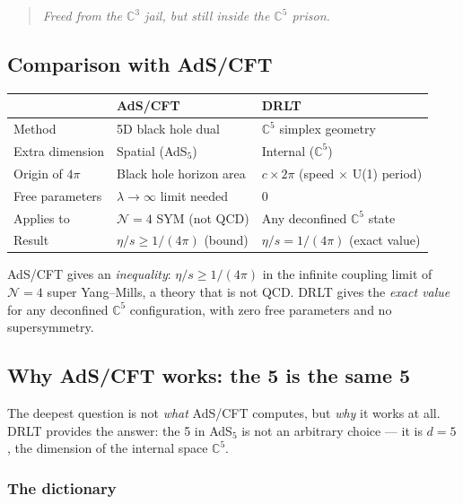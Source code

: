 \begin{quote}
\emph{Freed from the $\mathbb{C}^3$ jail, but still inside the $\mathbb{C}^5$ prison.}
\end{quote}

\subsection{Comparison with AdS/CFT}

\begin{center}
\begin{tabular}{lll}
\hline
& AdS/CFT & DRLT \\
\hline
Method & 5D black hole dual & $\mathbb{C}^5$ simplex geometry \\
Extra dimension & Spatial (AdS$_5$) & Internal ($\mathbb{C}^5$) \\
Origin of $4\pi$ & Black hole horizon area & $c \times 2\pi$ (speed $\times$ U(1) period) \\
Free parameters & $\lambda \to \infty$ limit needed & 0 \\
Applies to & $\mathcal{N}{=}4$ SYM (not QCD) & Any deconfined $\mathbb{C}^5$ state \\
Result & $\eta/s \geq 1/(4\pi)$ (bound) & $\eta/s = 1/(4\pi)$ (exact value) \\
\hline
\end{tabular}
\end{center}

AdS/CFT gives an \emph{inequality}: $\eta/s \geq 1/(4\pi)$ in the infinite coupling limit of $\mathcal{N} = 4$ super Yang--Mills, a theory that is not QCD. DRLT gives the \emph{exact value} for any deconfined $\mathbb{C}^5$ configuration, with zero free parameters and no supersymmetry.

\subsection{Why AdS/CFT works: the 5 is the same 5}

The deepest question is not \emph{what} AdS/CFT computes, but \emph{why} it works at all. DRLT provides the answer: the 5 in AdS$_5$ is not an arbitrary choice --- it is $d = 5$, the dimension of the internal space $\mathbb{C}^5$.

\subsubsection{The dictionary}

